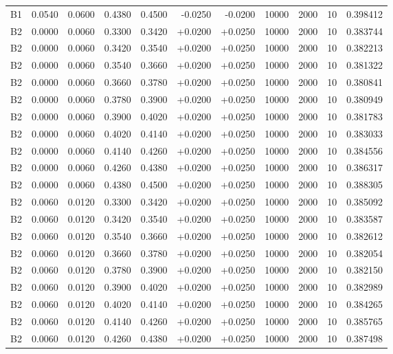\documentclass{article}
\begin{document}
\begin{longtable}{l r r r r r r r r r l}
B1 & 0.0540 & 0.0600 & 0.4380 & 0.4500 & -0.0250 & -0.0200 & 10000 & 2000 & 10 & 0.398412 \\
B2 & 0.0000 & 0.0060 & 0.3300 & 0.3420 & +0.0200 & +0.0250 & 10000 & 2000 & 10 & 0.383744 \\
B2 & 0.0000 & 0.0060 & 0.3420 & 0.3540 & +0.0200 & +0.0250 & 10000 & 2000 & 10 & 0.382213 \\
B2 & 0.0000 & 0.0060 & 0.3540 & 0.3660 & +0.0200 & +0.0250 & 10000 & 2000 & 10 & 0.381322 \\
B2 & 0.0000 & 0.0060 & 0.3660 & 0.3780 & +0.0200 & +0.0250 & 10000 & 2000 & 10 & 0.380841 \\
B2 & 0.0000 & 0.0060 & 0.3780 & 0.3900 & +0.0200 & +0.0250 & 10000 & 2000 & 10 & 0.380949 \\
B2 & 0.0000 & 0.0060 & 0.3900 & 0.4020 & +0.0200 & +0.0250 & 10000 & 2000 & 10 & 0.381783 \\
B2 & 0.0000 & 0.0060 & 0.4020 & 0.4140 & +0.0200 & +0.0250 & 10000 & 2000 & 10 & 0.383033 \\
B2 & 0.0000 & 0.0060 & 0.4140 & 0.4260 & +0.0200 & +0.0250 & 10000 & 2000 & 10 & 0.384556 \\
B2 & 0.0000 & 0.0060 & 0.4260 & 0.4380 & +0.0200 & +0.0250 & 10000 & 2000 & 10 & 0.386317 \\
B2 & 0.0000 & 0.0060 & 0.4380 & 0.4500 & +0.0200 & +0.0250 & 10000 & 2000 & 10 & 0.388305 \\
B2 & 0.0060 & 0.0120 & 0.3300 & 0.3420 & +0.0200 & +0.0250 & 10000 & 2000 & 10 & 0.385092 \\
B2 & 0.0060 & 0.0120 & 0.3420 & 0.3540 & +0.0200 & +0.0250 & 10000 & 2000 & 10 & 0.383587 \\
B2 & 0.0060 & 0.0120 & 0.3540 & 0.3660 & +0.0200 & +0.0250 & 10000 & 2000 & 10 & 0.382612 \\
B2 & 0.0060 & 0.0120 & 0.3660 & 0.3780 & +0.0200 & +0.0250 & 10000 & 2000 & 10 & 0.382054 \\
B2 & 0.0060 & 0.0120 & 0.3780 & 0.3900 & +0.0200 & +0.0250 & 10000 & 2000 & 10 & 0.382150 \\
B2 & 0.0060 & 0.0120 & 0.3900 & 0.4020 & +0.0200 & +0.0250 & 10000 & 2000 & 10 & 0.382989 \\
B2 & 0.0060 & 0.0120 & 0.4020 & 0.4140 & +0.0200 & +0.0250 & 10000 & 2000 & 10 & 0.384265 \\
B2 & 0.0060 & 0.0120 & 0.4140 & 0.4260 & +0.0200 & +0.0250 & 10000 & 2000 & 10 & 0.385765 \\
B2 & 0.0060 & 0.0120 & 0.4260 & 0.4380 & +0.0200 & +0.0250 & 10000 & 2000 & 10 & 0.387498 \\

\end{longtable}
\end{document}

